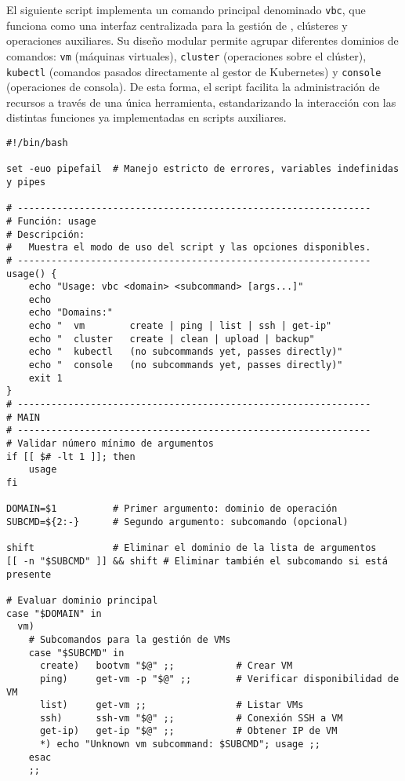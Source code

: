 El siguiente script implementa un comando principal denominado \texttt{vbc}, que funciona como una interfaz centralizada para la gestión de \VM, clústeres y operaciones auxiliares. Su diseño modular permite agrupar diferentes dominios de comandos: \texttt{vm} (máquinas virtuales), \texttt{cluster} (operaciones sobre el clúster), \texttt{kubectl} (comandos pasados directamente al gestor de Kubernetes) y \texttt{console} (operaciones de consola). De esta forma, el script facilita la administración de recursos a través de una única herramienta, estandarizando la interacción con las distintas funciones ya implementadas en scripts auxiliares.

\begin{verbatim}
#!/bin/bash

set -euo pipefail  # Manejo estricto de errores, variables indefinidas y pipes

# ---------------------------------------------------------------
# Función: usage
# Descripción:
#   Muestra el modo de uso del script y las opciones disponibles.
# ---------------------------------------------------------------
usage() {
    echo "Usage: vbc <domain> <subcommand> [args...]"
    echo
    echo "Domains:"
    echo "  vm        create | ping | list | ssh | get-ip"
    echo "  cluster   create | clean | upload | backup"
    echo "  kubectl   (no subcommands yet, passes directly)"
    echo "  console   (no subcommands yet, passes directly)"
    exit 1
}
# ---------------------------------------------------------------
# MAIN
# ---------------------------------------------------------------
# Validar número mínimo de argumentos
if [[ $# -lt 1 ]]; then
    usage
fi

DOMAIN=$1          # Primer argumento: dominio de operación
SUBCMD=${2:-}      # Segundo argumento: subcomando (opcional)

shift              # Eliminar el dominio de la lista de argumentos
[[ -n "$SUBCMD" ]] && shift # Eliminar también el subcomando si está presente

# Evaluar dominio principal
case "$DOMAIN" in
  vm)
    # Subcomandos para la gestión de VMs
    case "$SUBCMD" in
      create)   bootvm "$@" ;;           # Crear VM
      ping)     get-vm -p "$@" ;;        # Verificar disponibilidad de VM
      list)     get-vm ;;                # Listar VMs
      ssh)      ssh-vm "$@" ;;           # Conexión SSH a VM
      get-ip)   get-ip "$@" ;;           # Obtener IP de VM
      *) echo "Unknown vm subcommand: $SUBCMD"; usage ;;
    esac
    ;;


\end{verbatim}
